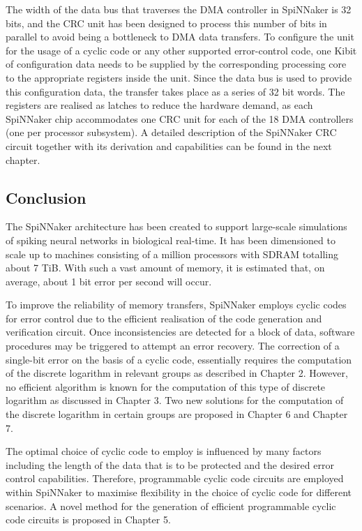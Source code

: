 \documentclass[oneside, a4paper, 11pt]{memoir}
\begin{document}
The width of the data bus that traverses the DMA controller in SpiNNaker is 32 bits, and the CRC unit has been designed to process this number of bits in parallel to avoid being a bottleneck to DMA data transfers. To configure the unit for the usage of a cyclic code or any other supported error-control code, one Kibit of configuration data needs to be supplied by the corresponding processing core to the appropriate registers inside the unit. Since the data bus is used to provide this configuration data, the transfer takes place as a series of 32 bit words. The registers are realised as latches to reduce the hardware demand, as each SpiNNaker chip accommodates one CRC unit for each of the 18 DMA controllers (one per processor subsystem). A detailed description of the SpiNNaker CRC circuit together with its derivation and capabilities can be found in the next chapter.

\subsection{Conclusion}
The SpiNNaker architecture has been created to support large-scale simulations of spiking neural networks in biological real-time. It has been dimensioned to scale up to machines consisting of a million processors with SDRAM totalling about 7 TiB. With such a vast amount of memory, it is estimated that, on average, about 1 bit error per second will occur.

To improve the reliability of memory transfers, SpiNNaker employs cyclic codes for error control due to the efficient realisation of the code generation and verification circuit. Once inconsistencies are detected for a block of data, software procedures may be triggered to attempt an error recovery. The correction of a single-bit error on the basis of a cyclic code, essentially requires the computation of the discrete logarithm in relevant groups as described in Chapter 2. However, no efficient algorithm is known for the computation of this type of discrete logarithm as discussed in Chapter 3. Two new solutions for the computation of the discrete logarithm in certain groups are proposed in Chapter 6 and Chapter 7.

The optimal choice of cyclic code to employ is influenced by many factors including the length of the data that is to be protected and the desired error control capabilities. Therefore, programmable cyclic code circuits are employed within SpiNNaker to maximise flexibility in the choice of cyclic code for different scenarios. A novel method for the generation of efficient programmable cyclic code circuits is proposed in Chapter 5.
\end{document}
